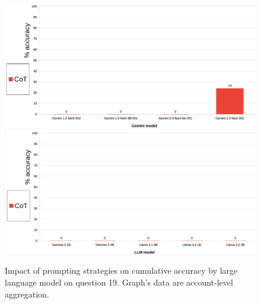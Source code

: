 \documentclass[12pt]{article}
\begin{document}
\begin{figure}[H]
    \centering
            \includegraphics[width=1\textwidth]{q307Gemini.png}
            \includegraphics[width=1\textwidth]{q307Other.png}
    \caption[Accuracy on Question 19 by LLM]{Impact of prompting strategies on cumulative accuracy by large language model on question 19. Graph's data are account-level aggregation.}
    \label{fig:44}
    \end{figure} 

\vspace{2cm}

\end{document}
